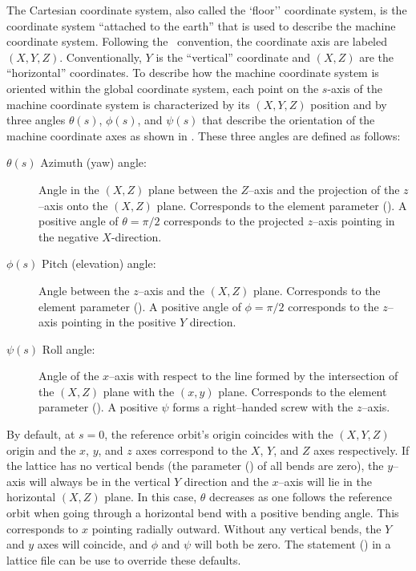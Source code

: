 The Cartesian  coordinate system, also called the `floor'' coordinate system, is the
coordinate system ``attached to the earth'' that is used to describe the machine coordinate
system. Following the \mad\ convention, the  coordinate axis are labeled $(X, Y,
Z)$. Conventionally, $Y$ is the ``vertical'' coordinate and $(X, Z)$ are the ``horizontal''
coordinates. To describe how the machine coordinate system is oriented within the global coordinate
system, each point on the $s$-axis of the machine coordinate system is characterized by its $(X, Y,
Z)$ position and by three angles $\theta(s)$, $\phi(s)$, and $\psi(s)$ that describe the orientation
of the machine coordinate axes as shown in . These three angles are defined as
follows:
\begin{description}
%
\item[$\theta(s)$ Azimuth (yaw) angle:] 
Angle in the $(X, Z)$ plane between the $Z$--axis and the projection of the $z$--axis onto the $(X,
Z)$ plane. Corresponds to the  element parameter (). A positive angle of
$\theta = \pi/2$ corresponds to the projected $z$--axis pointing in the negative $X$-direction.
%
\item[$\phi(s)$ Pitch (elevation) angle:] 
Angle between the $z$--axis and the $(X,Z)$ plane. Corresponds to the  element parameter
(). A positive angle of $\phi = \pi/2$ corresponds to the $z$--axis pointing in the
positive $Y$ direction.
%
\item[$\psi(s)$ Roll angle:] 
Angle of the $x$--axis with respect to the line formed by the intersection of the $(X, Z)$ plane
with the $(x, y)$ plane. Corresponds to the  element parameter (). A
positive $\psi$ forms a right--handed screw with the $z$--axis.
\end{description}

By default, at $s = 0$, the reference orbit's origin coincides with the $(X, Y, Z)$ origin and the
$x$, $y$, and $z$ axes correspond to the $X$, $Y$, and $Z$ axes respectively. If the lattice has no
vertical bends (the  parameter () of all bends are zero), the $y$--axis
will always be in the vertical $Y$ direction and the $x$--axis will lie in the horizontal $(X,Z)$
plane. In this case, $\theta$ decreases as one follows the reference orbit when going through a
horizontal bend with a positive bending angle. This corresponds to $x$ pointing radially
outward. Without any vertical bends, the $Y$ and $y$ axes will coincide, and $\phi$ and $\psi$ will
both be zero. The  statement () in a lattice file can be use to
override these defaults.

